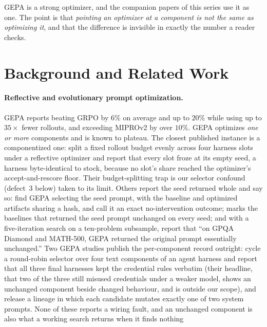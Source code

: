 \documentclass[11pt]{article}
\begin{document}
GEPA is a strong optimizer, and the companion papers of this
series use it as one. The point is that \emph{pointing an optimizer at a component is not the same
as optimizing it}, and that the difference is invisible in exactly the number a reader checks.

\section{Background and Related Work}
\label{sec:related}

\paragraph{Reflective and evolutionary prompt optimization.}
GEPA \citep{agrawal2025gepa} reports beating GRPO by $6\%$ on average and up to $20\%$ while
using up to $35\times$ fewer rollouts, and exceeding MIPROv2 by over $10\%$. GEPA
optimizes \emph{one or more} components and is known to plateau. The closest published
instance is a componentized one: \citet{nguyen2026harnessevo} split a fixed rollout budget evenly
across four harness slots under a reflective optimizer and report that every slot froze at its
empty seed, a harness byte-identical to stock, because no slot's share reached the optimizer's
accept-and-rescore floor. Their budget-splitting trap is our selector confound (defect~3 below)
taken to its limit. Others report the seed returned whole and say so:
\citet{giummarra2026localgepa} find GEPA selecting the seed prompt, with the baseline and optimized
artifacts sharing a hash, and call it an exact no-intervention outcome; \citet{singh2026mage} marks
the baselines that returned the seed prompt unchanged on every seed; and with a five-iteration
search on a ten-problem subsample, \citet{pappu2026multiagent} report that ``on GPQA Diamond and
MATH-500, GEPA returned the original prompt essentially unchanged.'' Two GEPA studies publish
the per-component record outright: \citet{so2026maskederosion} cycle a round-robin selector over
four text components of an agent harness and report that all three final harnesses kept the
credential rules verbatim (their headline, that two of the three still misused credentials under a
weaker model, shows an unchanged component beside changed behaviour, and is outside our scope), and \citet{lumer2026deepresearch} release a lineage in which each
candidate mutates exactly one of two system prompts. None of these reports a
wiring fault, and an unchanged component is also what a working search returns when it finds nothing
\end{document}

